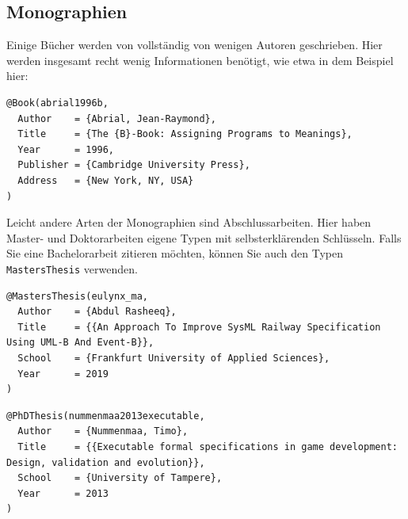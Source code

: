 \subsection{Monographien}

Einige Bücher werden von vollständig von wenigen Autoren geschrieben.
Hier werden insgesamt recht wenig Informationen benötigt,
wie etwa in dem Beispiel hier:

\begin{verbatim}
@Book(abrial1996b,
  Author	= {Abrial, Jean-Raymond},
  Title		= {The {B}-Book: Assigning Programs to Meanings},
  Year		= 1996,
  Publisher	= {Cambridge University Press},
  Address	= {New York, NY, USA}
)
\end{verbatim}

Leicht andere Arten der Monographien sind Abschlussarbeiten.
Hier haben Master- und Doktorarbeiten eigene Typen mit selbsterklärenden Schlüsseln.
Falls Sie eine Bachelorarbeit zitieren möchten, können Sie auch den Typen \verb|MastersThesis| verwenden.

\begin{verbatim}
@MastersThesis(eulynx_ma,
  Author    = {Abdul Rasheeq},
  Title     = {{An Approach To Improve SysML Railway Specification Using UML-B And Event-B}},
  School    = {Frankfurt University of Applied Sciences},
  Year      = 2019
)
\end{verbatim}

\begin{verbatim}
@PhDThesis(nummenmaa2013executable,
  Author    = {Nummenmaa, Timo},
  Title     = {{Executable formal specifications in game development: Design, validation and evolution}},
  School    = {University of Tampere},
  Year      = 2013
)
\end{verbatim}
